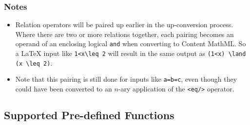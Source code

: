 \subsubsection*{Notes}

\begin{itemize}
\item
  Relation operators will be paired up earlier in the up-conversion
  process. Where there are two or more relations together, each pairing
  becomes an operand of an enclosing logical \verb|and| when
  converting to Content MathML. So a LaTeX input like \verb|1<x\leq 2| will
  result in the same output as \verb|(1<x) \land (x \leq 2)|.

\item
  Note that this pairing is still done for inputs like \verb|a=b=c|,
  even though they could have been converted to an $n$-ary application of
  the \verb|<eq/>| operator.
\end{itemize}

\subsection*{Supported Pre-defined Functions}

